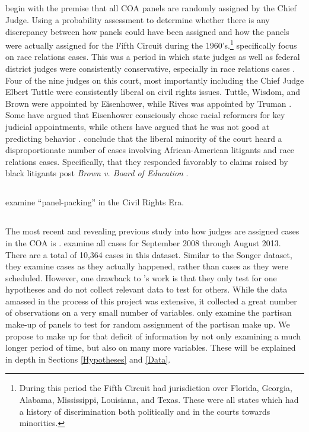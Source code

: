 \documentclass[12pt]{article}
\begin{document}
\subsection*{\cite{Atkins1974}}
\citet{Atkins1974} begin with the premise that all COA panels are randomly assigned by the Chief Judge.  Using a probability assessment to determine whether there is any discrepancy between how panels could have been assigned and how the panels were actually assigned for the Fifth Circuit during the 1960's.\footnote{During this period the Fifth Circuit had jurisdiction over Florida, Georgia, Alabama, Mississippi, Louisiana, and Texas.  These were all states which had a history of discrimination both politically and in the courts towards minorities.}  \citeauthor{Atkins1974} specifically focus on race relations cases.  This was a period in which state judges as well as federal district judges were consistently conservative, especially in race relations cases \citep{Atkins1974}.  Four of the nine judges on this court, most importantly including the Chief Judge Elbert Tuttle were consistently liberal on civil rights issues.  Tuttle, Wisdom, and Brown were appointed by Eisenhower, while Rives was appointed by Truman \citep{FJC}.   Some have argued that Eisenhower consciously chose racial reformers for key judicial appointments, while others have argued that he was not good at predicting behavior  \citep{kahn1992shattering,ambrose1984eisenhower}.  \cite{Atkins1974} conclude that the liberal minority of the court heard a disproportionate number of cases involving African-American litigants and race relations cases.  Specifically, that they responded favorably to claims raised by black litigants post \textit{Brown v. Board of Education} \citeyearpar{warren1954brown}.

\subsection*{\cite{Brown2000}}
\citet{Brown2000} examine ``panel-packing'' in the Civil Rights Era.

\subsection*{\cite{Chilton2014}}
The most recent and revealing previous study into how judges are assigned cases in the COA is \cite{Chilton2014}.  \citeauthor{Chilton2014} examine all cases for September 2008 through August 2013.  There are a total of 10,364 cases in this dataset.  Similar to the Songer dataset, they examine cases as they actually happened, rather than cases as they were scheduled.  However, one drawback to \citeauthor{Chilton2014}'s work is that they only test for one hypotheses and do not collect relevant data to test for others.  While the data amassed in the process of this project was extensive, it collected a great number of observations on a very small number of variables.  \citeauthor{Chilton2014} only examine the partisan make-up of panels to test for random assignment of the partisan make up.  We propose to make up for that deficit of information by not only examining a much longer period of time, but also on many more variables. These will be explained in depth in Sections \ref{Hypotheses} and \ref{Data}.  
\end{document}
